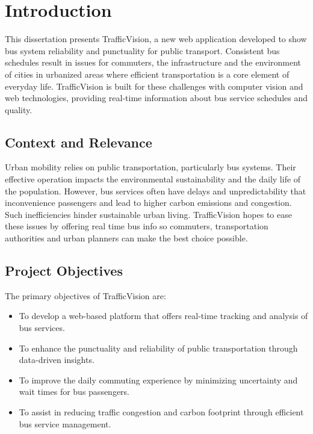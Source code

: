 \chapter{Introduction}
This dissertation presents TrafficVision, a new web application developed to show bus system reliability and punctuality for public transport. Consistent bus schedules result in issues for commuters, the infrastructure and the environment of cities in urbanized areas where efficient transportation is a core element of everyday life. TrafficVision is built for these challenges with computer vision and web technologies, providing real-time information about bus service schedules and quality.

\section{Context and Relevance}

Urban mobility relies on public transportation, particularly bus systems. Their effective operation impacts the environmental sustainability and the daily life of the population. However, bus services often have delays and unpredictability that inconvenience passengers and lead to higher carbon emissions and congestion. Such inefficiencies hinder sustainable urban living. TrafficVision hopes to ease these issues by offering real time bus info so commuters, transportation authorities and urban planners can make the best choice possible.

\section{Project Objectives}

The primary objectives of TrafficVision are:

\begin{itemize}
    \item To develop a web-based platform that offers real-time tracking and analysis of bus services.
    \item To enhance the punctuality and reliability of public transportation through data-driven insights.
    \item To improve the daily commuting experience by minimizing uncertainty and wait times for bus passengers.
    \item To assist in reducing traffic congestion and carbon footprint through efficient bus service management.
\end{itemize}

